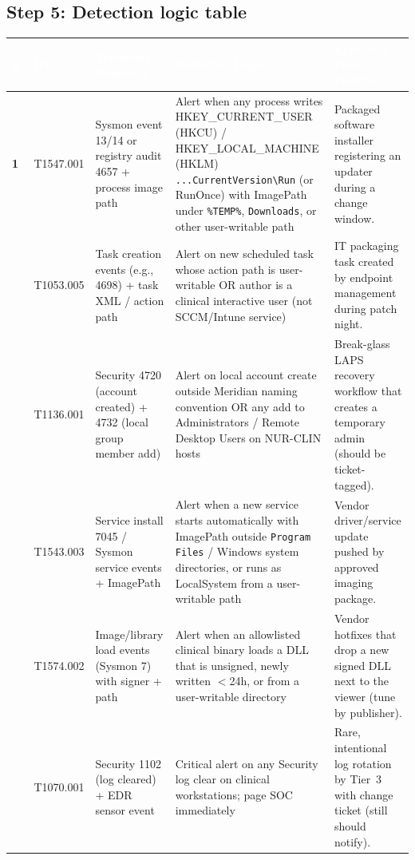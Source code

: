 \documentclass[11pt,letterpaper]{article}
\renewcommand{\arraystretch}{1.28}
\newcommand{\labtablesetup}{%
  \small
  \setlength{\tabcolsep}{6pt}%
  \renewcommand{\arraystretch}{1.45}%
}
\begin{document}
\subsection*{Step 5: Detection logic table}

\begingroup\labtablesetup
{}
\begin{tabularx}{\textwidth}{@{}>{\bfseries\centering\arraybackslash}p{0.55cm} >{\RaggedRight\arraybackslash}p{1.05cm} >{\RaggedRight\arraybackslash}p{2.15cm} >{\RaggedRight\arraybackslash}X >{\RaggedRight\arraybackslash}X@{}}
\toprule
\rowcolor{tblhead}
\textcolor{white}{\textbf{\#}} &
\textcolor{white}{\textbf{ID}} &
\textcolor{white}{\textbf{Telemetry Required}} &
\textcolor{white}{\textbf{Detection Logic}} &
\textcolor{white}{\textbf{Expected False Positive}} \\
\midrule
\rowcolor{white}
1 & T1547.001
  & Sysmon event 13/14 or registry audit 4657 + process image path
  & Alert when any process writes HKEY\_CURRENT\_USER (HKCU) / HKEY\_LOCAL\_MACHINE (HKLM) \texttt{...CurrentVersion\textbackslash Run} (or RunOnce) with ImagePath under \texttt{\%TEMP\%}, \texttt{Downloads}, or other user-writable path
  & Packaged software installer registering an updater during a change window. \\
2 & T1053.005
  & Task creation events (e.g., 4698) + task XML / action path
  & Alert on new scheduled task whose action path is user-writable OR author is a clinical interactive user (not SCCM/Intune service)
  & IT packaging task created by endpoint management during patch night. \\
3 & T1136.001
  & Security 4720 (account created) + 4732 (local group member add)
  & Alert on local account create outside Meridian naming convention OR any add to Administrators / Remote Desktop Users on NUR-CLIN hosts
  & Break-glass LAPS recovery workflow that creates a temporary admin (should be ticket-tagged). \\
4 & T1543.003
  & Service install 7045 / Sysmon service events + ImagePath
  & Alert when a new service starts automatically with ImagePath outside \texttt{Program Files} / Windows system directories, or runs as LocalSystem from a user-writable path
  & Vendor driver/service update pushed by approved imaging package. \\
5 & T1574.002
  & Image/library load events (Sysmon 7) with signer + path
  & Alert when an allowlisted clinical binary loads a DLL that is unsigned, newly written $<$24h, or from a user-writable directory
  & Vendor hotfixes that drop a new signed DLL next to the viewer (tune by publisher). \\
6 & T1070.001
  & Security 1102 (log cleared) + EDR sensor event
  & Critical alert on any Security log clear on clinical workstations; page SOC immediately
  & Rare, intentional log rotation by Tier~3 with change ticket (still should notify). \\
\bottomrule
\end{tabularx}
\endgroup
\end{document}
